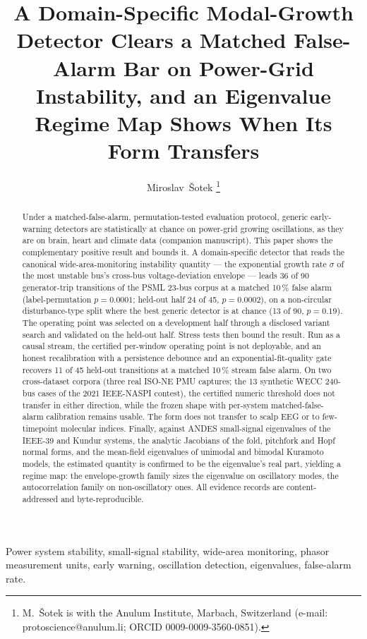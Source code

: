\documentclass[journal]{IEEEtran}
\title{A Domain-Specific Modal-Growth Detector Clears a Matched
False-Alarm Bar on Power-Grid Instability, and an Eigenvalue Regime Map
Shows When Its Form Transfers}
\author{Miroslav~\v{S}otek%
\thanks{M.~\v{S}otek is with the Anulum Institute, Marbach,
Switzerland (e-mail: protoscience@anulum.li; ORCID
0009-0009-3560-0851).}}
\begin{document}
\maketitle

\begin{abstract}
Under a matched-false-alarm, permutation-tested evaluation protocol,
generic early-warning detectors are statistically at chance on
power-grid growing oscillations, as they are on brain, heart and
climate data (companion manuscript). This paper shows the complementary
positive result and bounds it. A domain-specific detector that reads
the canonical wide-area-monitoring instability quantity --- the
exponential growth rate $\sigma$ of the most unstable bus's cross-bus
voltage-deviation envelope --- leads 36 of 90 generator-trip
transitions of the PSML 23-bus corpus at a matched 10\,\% false alarm
(label-permutation $p = 0.0001$; held-out half 24 of 45, $p = 0.0002$),
on a non-circular disturbance-type split where the best generic
detector is at chance (13 of 90, $p = 0.19$). The operating point was
selected on a development half through a disclosed variant search and
validated on the held-out half. Stress tests then bound the result.
Run as a causal stream, the certified per-window operating point is
not deployable, and an honest recalibration with a persistence
debounce and an exponential-fit-quality gate recovers 11 of 45
held-out transitions at a matched 10\,\% stream false alarm. On two
cross-dataset corpora (three real ISO-NE PMU captures; the 13
synthetic WECC 240-bus cases of the 2021 IEEE-NASPI contest), the
certified numeric threshold does not transfer in either direction,
while the frozen shape with per-system matched-false-alarm calibration
remains usable. The form does not transfer to scalp EEG or to
few-timepoint molecular indices. Finally, against ANDES small-signal
eigenvalues of the IEEE-39 and Kundur systems, the analytic Jacobians
of the fold, pitchfork and Hopf normal forms, and the mean-field
eigenvalues of unimodal and bimodal Kuramoto models, the estimated
quantity is confirmed to be the eigenvalue's real part, yielding a
regime map: the envelope-growth family sizes the eigenvalue on
oscillatory modes, the autocorrelation family on non-oscillatory ones.
All evidence records are content-addressed and byte-reproducible.
\end{abstract}

\begin{IEEEkeywords}
Power system stability, small-signal stability, wide-area monitoring,
phasor measurement units, early warning, oscillation detection,
eigenvalues, false-alarm rate.
\end{IEEEkeywords}
\end{document}
